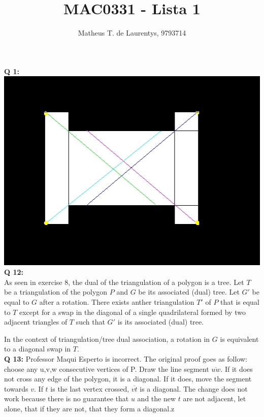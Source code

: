 \documentclass[]{article}
\title{\vspace{-4.0cm}MAC0331 - Lista 1}
\author{Matheus T. de Laurentys, 9793714}
\begin{document}
	\maketitle
	\noindent
	\textbf{Q 1:} \\
	\includegraphics[scale=0.8]{lista2im.jpeg} \\
	\textbf{Q 12:} \\
	As seen in exercise 8, the dual of the triangulation of a polygon is a tree. Let $T$ be a triangulation of the polygon $P$ and $G$ be its associated (dual) tree. Let $G'$ be equal to $G$ after a rotation. There exists anther triangulation $T'$ of $P$ that is equal to $T$ except for a swap in the diagonal of a single quadrilateral formed by two adjacent triangles of $T$ such that $G'$ is its associated (dual) tree.
	
	In the context of triangulation/tree dual association, a rotation in $G$ is equivalent to a diagonal swap in $T$. \\
	\textbf{Q 13:}
	Professor Maqui Esperto is incorrect. The original proof goes as follow: choose any u,v,w consecutive vertices of P. Draw the line segment $\overline{uw}$. If it does not cross any edge of the polygon, it is a diagonal. If it does, move the segment towards $v$. If $t$ is the last vertex crossed, $\overline{vt}$ is a diagonal. The change does not work because there is no guarantee that $u$ and the new $t$ are not adjacent, let alone, that if they are not, that they form a diagonal.z
\end{document}

